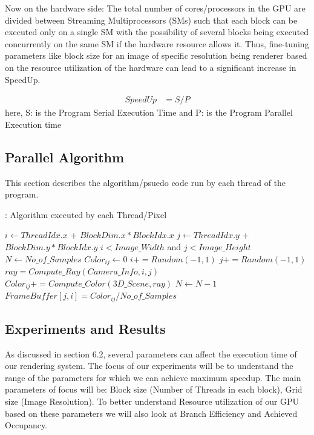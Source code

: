 \documentclass[sigconf, nonacm]{acmart}
\begin{document}
Now on the hardware side: The total number of cores/processors in the GPU are divided between Streaming Multiprocessors (SMs) such that each block can be executed only on a single SM with the possibility of several blocks being executed concurrently on the same SM if the hardware resource allows it. Thus, fine-tuning parameters like block size for an image of specific resolution being renderer based on the resource utilization of the hardware can lead to a significant increase in SpeedUp.

\begin{align}
    SpeedUp &= S/P
\end{align}
here, S: is the Program Serial Execution Time and P: is the Program Parallel Execution time

\subsection{Parallel Algorithm}
This section describes the algorithm/psuedo code run by each thread of the program.
\begin{algorithm}[H]
\caption{: Algorithm executed by each Thread/Pixel}\label{alg:cap}
\begin{algorithmic}

\State $i \gets ThreadIdx.x$ + $ BlockDim.x * BlockIdx.x$
\State $j \gets ThreadIdx.y$ + $ BlockDim.y * BlockIdx.y$
\Ensure $i < Image\_Width $ and $ j < Image\_Height $
\State $N \gets No\_of\_Samples$
\State $Color_{ij} \gets 0$
    \State $i += Random(-1,1)$
    \State $j += Random(-1,1)$
    \State $ray =  Compute\_Ray( Camera\_Info, i, j)$  
    \State $Color_{ij} +=  Compute\_Color( 3D\_Scene, ray)$ 
    \State $N \gets N - 1$
\EndWhile
\State $FrameBuffer[j,i] =  Color_{ij}/No\_of\_Samples$ 
\end{algorithmic}
\end{algorithm}

\subsection{Experiments and Results}

As discussed in section 6.2, several parameters can affect the execution time of our rendering system. The focus of our experiments will be to understand the range of the parameters for which we can achieve maximum speedup. The main parameters of focus will be: Block size (Number of Threads in each block), Grid size (Image Resolution). To better understand Resource utilization of our GPU based on these parameters we will also look at Branch Efficiency and Achieved Occupancy.
\end{document}
